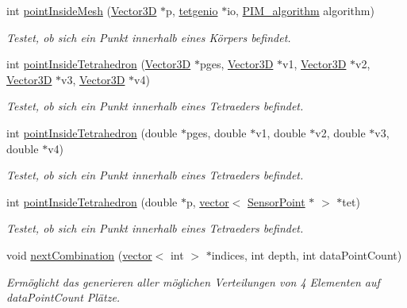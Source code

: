 \begin{DoxyCompactItemize}
int \hyperlink{namespaceUtils_af8fc5d6dab27f759ab5d76757a53023f}{point\-Inside\-Mesh} (\hyperlink{classVector3D}{Vector3\-D} $\ast$p, \hyperlink{classtetgenio}{tetgenio} $\ast$io, \hyperlink{namespaceUtils_ad369b0127cabda0d6871ce1ae7e6c862}{P\-I\-M\-\_\-algorithm} algorithm)
\begin{DoxyCompactList}\small\item\em Testet, ob sich ein Punkt innerhalb eines Körpers befindet. \end{DoxyCompactList}\item 
int \hyperlink{namespaceUtils_a9b995a1220a78be108b19bda4b776332}{point\-Inside\-Tetrahedron} (\hyperlink{classVector3D}{Vector3\-D} $\ast$pges, \hyperlink{classVector3D}{Vector3\-D} $\ast$v1, \hyperlink{classVector3D}{Vector3\-D} $\ast$v2, \hyperlink{classVector3D}{Vector3\-D} $\ast$v3, \hyperlink{classVector3D}{Vector3\-D} $\ast$v4)
\begin{DoxyCompactList}\small\item\em Testet, ob sich ein Punkt innerhalb eines Tetraeders befindet. \end{DoxyCompactList}\item 
int \hyperlink{namespaceUtils_a8f7379e1915d2a04907eb9d99d0a56ad}{point\-Inside\-Tetrahedron} (double $\ast$pges, double $\ast$v1, double $\ast$v2, double $\ast$v3, double $\ast$v4)
\begin{DoxyCompactList}\small\item\em Testet, ob sich ein Punkt innerhalb eines Tetraeders befindet. \end{DoxyCompactList}\item 
int \hyperlink{namespaceUtils_a40eaef4d22da849a5deb2f1153d88bbc}{point\-Inside\-Tetrahedron} (double $\ast$p, \hyperlink{classstd_1_1vector}{vector}$<$ \hyperlink{structUtils_1_1SensorPoint}{Sensor\-Point} $\ast$ $>$ $\ast$tet)
\begin{DoxyCompactList}\small\item\em Testet, ob sich ein Punkt innerhalb eines Tetraeders befindet. \end{DoxyCompactList}\item 
void \hyperlink{namespaceUtils_af4ba26e928c7cef5269c51bfac49d547}{next\-Combination} (\hyperlink{classstd_1_1vector}{vector}$<$ int $>$ $\ast$indices, int depth, int data\-Point\-Count)
\begin{DoxyCompactList}\small\item\em Ermöglicht das generieren aller möglichen Verteilungen von 4 Elementen auf data\-Point\-Count Plätze. \end{DoxyCompactList}\item 

\end{DoxyCompactItemize}
